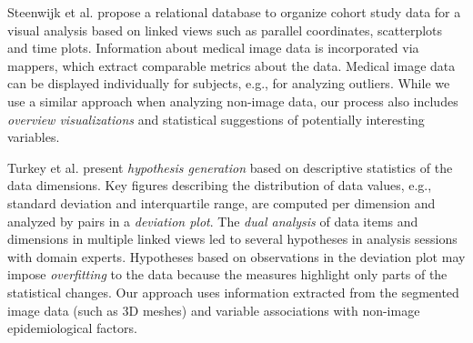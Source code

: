 \documentclass[journal]{style/vgtc} 			          %
\begin{document}
Steenwijk et al. \cite{Steenwijk2010} propose a relational database to organize cohort study data for a visual analysis based on linked views such as parallel coordinates, scatterplots and time plots.
%
Information about medical image data is incorporated via mappers, which extract comparable metrics about the data.
%
Medical image data can be displayed individually for subjects, e.g., for analyzing outliers.
%
While we use a similar approach when analyzing non-image data, our process also includes \emph{overview visualizations} and statistical suggestions of potentially interesting variables.
%

Turkey et al. \cite{Turkay2013} present \emph{hypothesis generation} based on descriptive statistics of the data dimensions.
%
Key figures describing the distribution of data values, e.g., standard deviation and interquartile range, are computed per dimension and analyzed by pairs in a \emph{deviation plot}.
%
%
The \emph{dual analysis} of data items and dimensions in multiple linked views led to several hypotheses in analysis sessions with domain experts.
%
Hypotheses based on observations in the deviation plot may impose \emph{overfitting} to the data because the measures highlight only parts of the statistical changes.
%
Our approach uses information extracted from the segmented image data (such as 3D meshes) and variable associations with non-image epidemiological factors.
\end{document}
